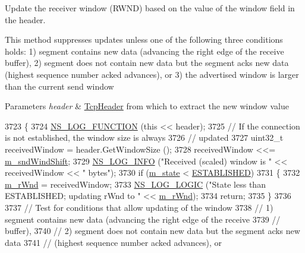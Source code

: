 Update the receiver window (R\+W\+ND) based on the value of the window field in the header. 

This method suppresses updates unless one of the following three conditions holds\+: 1) segment contains new data (advancing the right edge of the receive buffer), 2) segment does not contain new data but the segment acks new data (highest sequence number acked advances), or 3) the advertised window is larger than the current send window


\begin{DoxyParams}{Parameters}
{\em header} & \hyperlink{classns3_1_1TcpHeader}{Tcp\+Header} from which to extract the new window value \\
\hline
\end{DoxyParams}

\begin{DoxyCode}
3723 \{
3724   \hyperlink{log-macros-disabled_8h_a90b90d5bad1f39cb1b64923ea94c0761}{NS\_LOG\_FUNCTION} (\textcolor{keyword}{this} << header);
3725   \textcolor{comment}{//  If the connection is not established, the window size is always}
3726   \textcolor{comment}{//  updated}
3727   uint32\_t receivedWindow = header.GetWindowSize ();
3728   receivedWindow <<= \hyperlink{classns3_1_1TcpSocketBase_a249576feb9975ab927aeeda274d9bef0}{m\_sndWindShift};
3729   \hyperlink{group__logging_gafbd73ee2cf9f26b319f49086d8e860fb}{NS\_LOG\_INFO} (\textcolor{stringliteral}{"Received (scaled) window is "} << receivedWindow << \textcolor{stringliteral}{" bytes"});
3730   \textcolor{keywordflow}{if} (\hyperlink{classns3_1_1TcpSocketBase_a5db6f29272f23546e23320c06a681f3e}{m\_state} < \hyperlink{group__tcp_gga3929cdb47bdf159657fa24054aa5ca03a1826ad465d372319d1db905886de3743}{ESTABLISHED})
3731     \{
3732       \hyperlink{classns3_1_1TcpSocketBase_af3fafd1671964e0674677be541e1501a}{m\_rWnd} = receivedWindow;
3733       \hyperlink{group__logging_ga88acd260151caf2db9c0fc84997f45ce}{NS\_LOG\_LOGIC} (\textcolor{stringliteral}{"State less than ESTABLISHED; updating rWnd to "} << 
      \hyperlink{classns3_1_1TcpSocketBase_af3fafd1671964e0674677be541e1501a}{m\_rWnd});
3734       \textcolor{keywordflow}{return};
3735     \}
3736 
3737   \textcolor{comment}{// Test for conditions that allow updating of the window}
3738   \textcolor{comment}{// 1) segment contains new data (advancing the right edge of the receive}
3739   \textcolor{comment}{// buffer),}
3740   \textcolor{comment}{// 2) segment does not contain new data but the segment acks new data}
3741   \textcolor{comment}{// (highest sequence number acked advances), or}

\end{DoxyCode}
